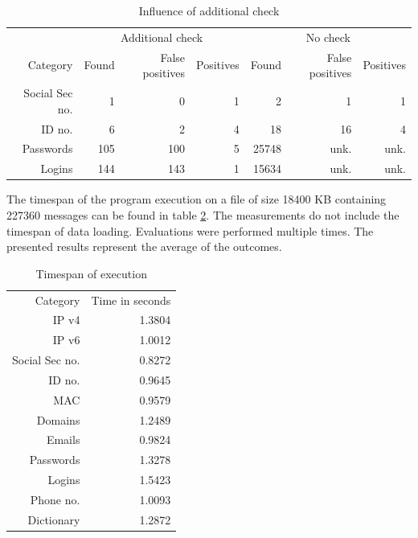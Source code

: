 \documentclass[a4paper,twoside,12pt]{book}
\begin{document}
\begin{table}
   \centering
   \caption{Influence of additional check}
   \label{id:tab:wynikiNoCheck}
   \begin{tabular}{rrrrrrr}
   \toprule
                     &           \multicolumn{3}{c}{Additional check}    &    \multicolumn{3}{c}{No check}\\
                                 \cmidrule(r){2-4}                            \cmidrule(r){5-7}
      Category       &   Found &   False positives & Positives &   Found &   False positives & Positives \\
      Social Sec no. &       1 &                 0 &         1 &       2 &                 1 &         1 \\
      ID no.         &       6 &                 2 &         4 &      18 &                16 &         4 \\
      Passwords      &     105 &               100 &         5 &   25748 &              unk. &      unk. \\
      Logins         &     144 &               143 &         1 &   15634 &              unk. &      unk. \\
   \bottomrule
   \end{tabular}
   \end{table} 


The timespan of the program execution on a file of size 18400 KB containing 227360 messages can be found in table \ref{id:tab:wynikiTime}. 
The measurements do not include the timespan of data loading. Evaluations were performed multiple times. The presented results
represent the average of the outcomes.

\begin{table}
   \centering
   \caption{Timespan of execution}
   \label{id:tab:wynikiTime}
   \begin{tabular}{rr}
   \toprule
      Category       &  Time in seconds \\
      IP v4          &           1.3804 \\
      IP v6          &           1.0012 \\
      Social Sec no. &           0.8272 \\
      ID no.         &           0.9645 \\
      MAC            &           0.9579 \\
      Domains        &           1.2489 \\
      Emails         &           0.9824 \\
      Passwords      &           1.3278 \\
      Logins         &           1.5423 \\
      Phone no.      &           1.0093 \\
      Dictionary     &           1.2872 \\ 
   \bottomrule
   \end{tabular}
   \end{table}  
\end{document}
